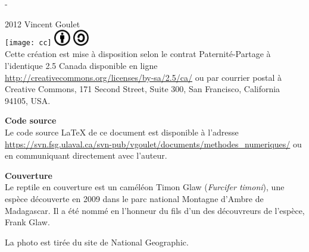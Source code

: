 

\cleardoublepage

\begin{adjustwidth*}{13.1mm}{-72mm}
  \sffamily
  \raggedright
  \vspace*{5mm}
  \thetitle \\
  \vspace*{3cm}
  \theauthor \\
  \vspace*{\fill}
  \thedate
\end{adjustwidth*}
\clearpage

\begingroup
\calccentering{\unitlength}
\begin{adjustwidth*}{\unitlength}{-\unitlength}
  \small
  \setlength{\parindent}{0pt}
  \setlength{\parskip}{\baselineskip}

  {\textcopyright} 2012 Vincent Goulet \\

  \texttt{[image: cc]}\;%
  \includegraphics[height=7mm,keepaspectratio=true]{by}\;%
  \includegraphics[height=7mm,keepaspectratio=true]{sa} \\
  Cette création est mise à disposition selon le contrat
  Paternité-Partage à l'identique 2.5 Canada disponible en ligne
  \url{http://creativecommons.org/licenses/by-sa/2.5/ca/} ou par
  courrier postal à Creative Commons, 171 Second Street, Suite 300,
  San Francisco, California 94105, USA.

  \textbf{Code source} \\
  Le code source {\LaTeX} de ce document est disponible à l'adresse
    \url{https://svn.fsg.ulaval.ca/svn-pub/vgoulet/documents/methodes_numeriques/}
  ou en communiquant directement avec l'auteur.

  \textbf{Couverture} \\
  Le reptile en couverture est un caméléon Timon Glaw (\emph{Furcifer
    timoni}), une espèce découverte en 2009 dans le parc national
  Montagne d’Ambre de Madagascar. Il a été nommé en l'honneur du fils
  d'un des découvreurs de l'espèce, Frank Glaw.

  La photo est tirée du site de National Geographic.
\end{adjustwidth*}
\endgroup

\clearpage

